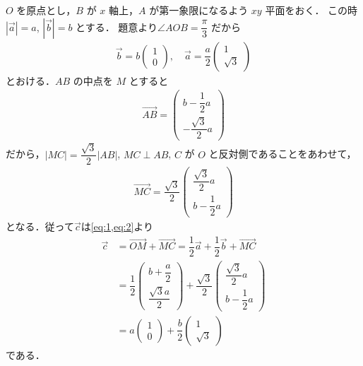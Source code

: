 \documentclass[../../main.tex]{subfiles}
\begin{document}
$O$ を原点とし，$B$ が $x$ 軸上，$A$ が第一象限になるよう $xy$ 平面をおく．
この時 $|\vec{a}| = a$, $|\vec{b}| = b$ とする．
題意より$\angle AOB = \dfrac{\pi}{3}$ だから
\begin{align}
  \vec{b} = b
  \begin{pmatrix} 1 \\ 0
  \end{pmatrix}, \quad \vec{a} = \dfrac{a}{2}
  \begin{pmatrix} 1 \\ \sqrt{3}
  \end{pmatrix} \label{eq:1}
\end{align}
とおける．$AB$ の中点を $M$ とすると
\begin{align}
  \overrightarrow{AB} =
  \begin{pmatrix} b - \dfrac{1}{2}a \\ -\dfrac{\sqrt{3}}{2}a
  \end{pmatrix}
\end{align}
だから，$|MC| = \dfrac{\sqrt{3}}{2}|AB|$, $MC \perp AB$, $C$ が $O$ と反対側であることをあわせて，
\begin{align}
  \overrightarrow{MC} = \dfrac{\sqrt{3}}{2}
  \begin{pmatrix} \dfrac{\sqrt{3}}{2}a \\ b - \dfrac{1}{2}a
  \end{pmatrix} \label{eq:2}
\end{align}
となる．従って$\vec{c}$は\cref{eq:1,eq:2}より
\begin{align}
  \vec{c} &= \overrightarrow{OM} + \overrightarrow{MC}
  = \dfrac{1}{2}\vec{a}+\dfrac{1}{2}\vec{b} +  \overrightarrow{MC} \\
  &=\dfrac{1}{2}
  \begin{pmatrix} b + \dfrac{a}{2} \\ \dfrac{\sqrt{3}a}{2}
  \end{pmatrix}
  +
  \dfrac{\sqrt{3}}{2}
  \begin{pmatrix} \dfrac{\sqrt{3}}{2}a \\ b - \dfrac{1}{2}a
  \end{pmatrix} \\
  &= a
  \begin{pmatrix} 1 \\ 0
  \end{pmatrix} + \dfrac{b}{2}
  \begin{pmatrix} 1 \\ \sqrt{3}
  \end{pmatrix} \label{eq:3}
\end{align}
である．
\end{document}
